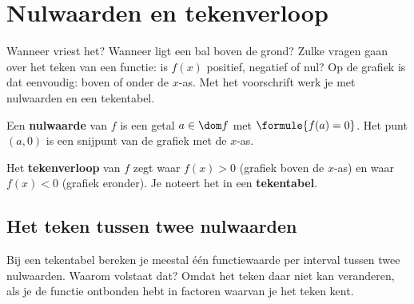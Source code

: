\section{Nulwaarden en tekenverloop}

Wanneer vriest het? Wanneer ligt een bal boven de grond? Zulke vragen gaan over het teken van een functie: is $f(x)$ positief, negatief of nul? Op de grafiek is dat eenvoudig: boven of onder de $x$-as. Met het voorschrift werk je met nulwaarden en een tekentabel.

\begin{theorie}
Een \textbf{\textcolor{accent}{nulwaarde}} van $f$ is een getal $a \in \dom f$ met $\formule{f(a) = 0}$. Het punt $(a, 0)$ is een snijpunt van de grafiek met de $x$-as.

Het \textbf{\textcolor{accent}{tekenverloop}} van $f$ zegt waar $f(x) > 0$ (grafiek boven de $x$-as) en waar $f(x) < 0$ (grafiek eronder). Je noteert het in een \textbf{\textcolor{accent}{tekentabel}}.
\end{theorie}

\subsection{Het teken tussen twee nulwaarden}

Bij een tekentabel bereken je meestal één functiewaarde per interval tussen twee nulwaarden. Waarom volstaat dat? Omdat het teken daar niet kan veranderen, als je de functie ontbonden hebt in factoren waarvan je het teken kent.

